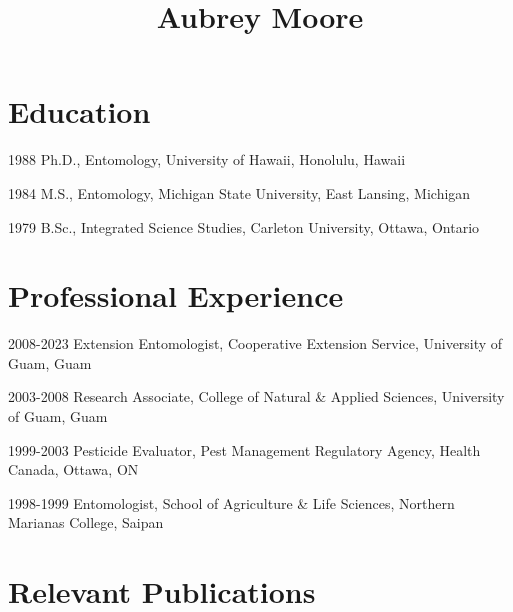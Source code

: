 \documentclass[12pt,english]{simplecv}
\begin{document}


\title{Aubrey Moore}

\maketitle

\section{Education}
\begin{topic}
\item [{1988}]Ph.D., Entomology, University of Hawaii, Honolulu, Hawaii
\item [{1984}] M.S., Entomology, Michigan State University, East Lansing, Michigan
\item [{1979}] B.Sc., Integrated Science Studies, Carleton University, Ottawa, Ontario 
\end{topic}

\section{Professional Experience}
\begin{topic}
\item [{2008-2023}] Extension Entomologist, Cooperative Extension Service, University of Guam, Guam 
\item [{2003-2008}] Research Associate, College of Natural \& Applied Sciences, University of Guam, Guam 
\item [{1999-2003}] Pesticide Evaluator, Pest Management Regulatory Agency, Health Canada, Ottawa, ON
\item [{1998-1999}] Entomologist, School of Agriculture \& Life Sciences,
Northern Marianas College, Saipan 
\end{topic}

\section{Relevant Publications}
\end{document}
